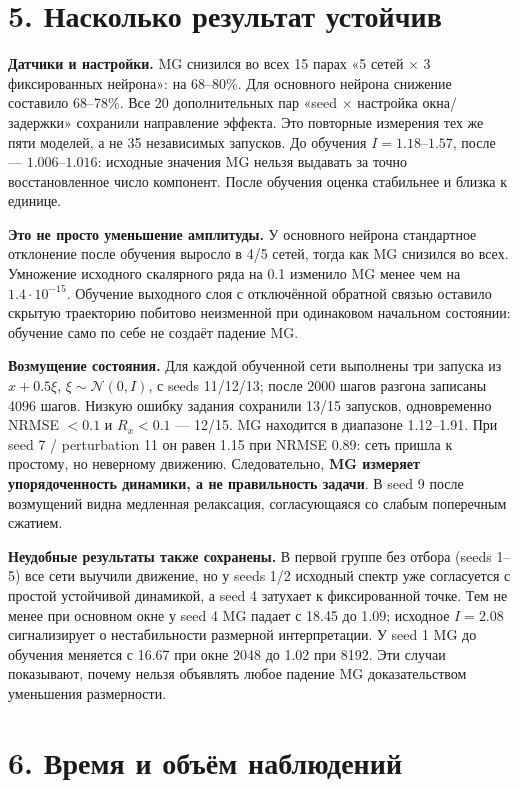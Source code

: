 \documentclass[10pt,a4paper]{article}
\begin{document}
\newpage

\section*{5. Насколько результат устойчив}

\textbf{Датчики и настройки.} MG снизился во всех 15 парах «5 сетей \ensuremath{\times} 3 фиксированных нейрона»: на 68--80\%. Для основного нейрона снижение составило 68--78\%. Все 20 дополнительных пар «seed \ensuremath{\times} настройка окна/задержки» сохранили направление эффекта. Это повторные измерения тех же пяти моделей, а не 35 независимых запусков. До обучения $I=1.18$--$1.57$, после --- $1.006$--$1.016$: исходные значения MG нельзя выдавать за точно восстановленное число компонент. После обучения оценка стабильнее и близка к единице.

\textbf{Это не просто уменьшение амплитуды.} У основного нейрона стандартное отклонение после обучения выросло в 4/5 сетей, тогда как MG снизился во всех. Умножение исходного скалярного ряда на 0.1 изменило MG менее чем на $1.4\cdot10^{-15}$. Обучение выходного слоя с отключённой обратной связью оставило скрытую траекторию побитово неизменной при одинаковом начальном состоянии: обучение само по себе не создаёт падение MG.

\textbf{Возмущение состояния.} Для каждой обученной сети выполнены три запуска из $x+0.5\xi$, $\xi\sim\mathcal N(0,I)$, с seeds 11/12/13; после 2000 шагов разгона записаны 4096 шагов. Низкую ошибку задания сохранили 13/15 запусков, одновременно NRMSE $<0.1$ и $R_x<0.1$ --- 12/15. MG находится в диапазоне 1.12--1.91. При seed 7 / perturbation 11 он равен 1.15 при NRMSE 0.89: сеть пришла к простому, но неверному движению. Следовательно, \textbf{MG измеряет упорядоченность динамики, а не правильность задачи}. В seed 9 после возмущений видна медленная релаксация, согласующаяся со слабым поперечным сжатием.

\textbf{Неудобные результаты также сохранены.} В первой группе без отбора (seeds 1--5) все сети выучили движение, но у seeds 1/2 исходный спектр уже согласуется с простой устойчивой динамикой, а seed 4 затухает к фиксированной точке. Тем не менее при основном окне у seed 4 MG падает с 18.45 до 1.09; исходное $I=2.08$ сигнализирует о нестабильности размерной интерпретации. У seed 1 MG до обучения меняется с 16.67 при окне 2048 до 1.02 при 8192. Эти случаи показывают, почему нельзя объявлять любое падение MG доказательством уменьшения размерности.

\section*{6. Время и объём наблюдений}
\end{document}
